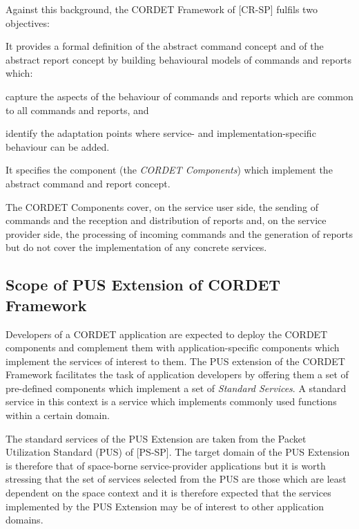 \documentclass[a4paper,10pt]{article}
\newenvironment{fw_itemize}						%
{\begin{itemize}
  \setlength{\itemsep}{1mm}
  \setlength{\parskip}{0pt}
  \setlength{\parsep}{0pt}}
{\end{itemize}}
\begin{document}
Against this background, the CORDET Framework of [CR-SP] fulfils two objectives:

\begin{fw_itemize}
\item{} It provides a formal definition of the abstract command concept and of the abstract report concept by building behavioural models of commands and reports which:
	\begin{fw_itemize}
	\item capture the aspects of the behaviour of commands and reports which are common to all commands and reports, and
	\item identify the adaptation points where service- and implementation-specific behaviour can be added.
	\end{fw_itemize}
\item{} It specifies the component (the \textit{CORDET Components}) which implement the abstract command and report concept.
\end{fw_itemize}

The CORDET Components cover, on the service user side, the sending of commands and the reception and distribution of reports and, on the service provider side, the processing of incoming commands and the generation of reports but do not cover the implementation of any concrete services. 

\subsection{Scope of PUS Extension of CORDET Framework}\label{sec:ScopePusExt}
Developers of a CORDET application are expected to deploy the CORDET components and complement them with application-specific components which implement the services of interest to them. The PUS extension of the CORDET Framework facilitates the task of application developers by offering them a set of pre-defined components which implement a set of \textit{Standard Services}. A standard service in this context is a service which implements commonly used functions within a certain domain. 

The standard services of the PUS Extension are taken from the Packet Utilization Standard (PUS) of [PS-SP]. The target domain of the PUS Extension is therefore that of space-borne service-provider applications but it is worth stressing that the set of services selected from the PUS are those which are least dependent on the space context and it is therefore expected that the services implemented by the PUS Extension may be of interest to other application domains.
\end{document}
